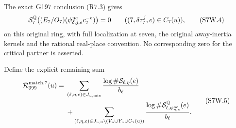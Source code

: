 The exact G197 conclusion (R7.3) gives
\[
 \mathcal S^{\mathbb Q}_7\bigl((E_7/O_7)
                (\psi^{\rm nc}_{\delta,j,e}c_7^{-e})\bigr)=0
                  \qquad((7,\delta\tau_7^j,e)\in C_7(u)),
 \tag{S7W.4}
\]
on this original ring, with full localization at seven, the original
away-inertia kernels and the rational real-place convention.
No corresponding zero for the critical partner is asserted.

Define the explicit remaining sum
\[
 \begin{split}
 \mathcal R_{399}^{\rm match,7}(u)={}&
 \sum_{(\ell,\eta,e)\in J_{u,\rm mix}}
                       \frac{\log\#\mathcal S_{\ell,\eta}(e)}{b_\ell}\\
 &+\sum_{(\ell,\eta,e)\in J_{u,0}\setminus(V_u\cup Y_u\cup C_7(u))}
           \frac{\log\#\mathcal S^{\mathbb Q}_{\ell,
                             \psi_{\eta,e}^{\rm nc}}(e)}{b_\ell}.
 \end{split}\tag{S7W.5}
\]

